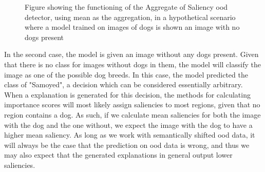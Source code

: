 \documentclass[UKenglish]{uiomasterthesis} %
\theoremstyle{definition}
\begin{document}
\begin{figure}[H]
\begin{center}

    \caption[Mean Saliency visual explanation]{Figure showing the functioning of the Aggregate of Saliency \ac{ood} detector, using mean as the aggregation, in a hypothetical scenario where a model trained on images of dogs is shown an image with no dogs present}
    \label{fig:meansaliency}

    \end{center}
\end{figure}

In the second case, the model is given an image without any dogs present. Given that there is no class for images without dogs in them, the model will classify the image as one of the possible dog breeds. In this case, the model predicted the class of "Samoyed", a decision which can be considered essentially arbitrary. When a explanation is generated for this decision, the methods for calculating importance scores will most likely assign saliencies to most regions, given that no region contains a dog. As such, if we calculate mean saliencies for both the image with the dog and the one without, we expect the image with the dog to have a higher mean saliency. As long as we work with semantically shifted \ac{ood} data, it will always be the case that the prediction on \ac{ood} data is wrong, and thus we may also expect that the generated explanations in general output lower saliencies.
\end{document}
